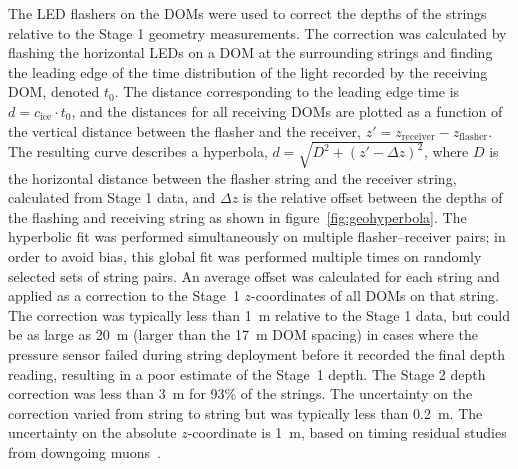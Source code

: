 The LED flashers on the DOMs were used to correct the depths of the strings relative to
the Stage 1 geometry measurements. The correction was calculated by flashing
the horizontal LEDs on a DOM at the surrounding strings and finding the
leading edge of the time distribution of the light recorded by the
receiving DOM, denoted $t_0$. The distance corresponding to the leading
edge time is $d = c_{\mathrm{ice}} \cdot t_0$, and the distances for all receiving
DOMs are plotted as a function of the vertical distance between the flasher
and the receiver, $z' = z_{\mathrm{receiver}} - z_{\mathrm{flasher}}$. The resulting curve
describes a hyperbola, $d = \sqrt{D^2 + (z' -\Delta z)^2}$, where $D$ is
the horizontal distance between the flasher string and the receiver string,
calculated from Stage 1 data, and $\Delta z$ is the relative offset between
the depths of the flashing and receiving string as shown in
figure~\ref{fig:geohyperbola}. The hyperbolic fit was performed
simultaneously on multiple flasher--receiver pairs; in order to avoid
bias, this global fit was performed multiple times on randomly
selected sets of string pairs. An average offset was calculated for
each string and applied as a correction to the Stage~1 $z$-coordinates
of all DOMs on that string. The correction was typically less than 1~m
relative to the Stage 1 data, but could be as large as 20~m (larger than the
17~m DOM spacing) in cases where the pressure sensor failed during string
deployment before it recorded the final depth reading, resulting in a
poor estimate of the Stage~1 depth. The Stage 2 depth correction was less than 3~m for 93\%
of the strings. The uncertainty on the correction varied from string
to string but was typically less than 0.2~m. The uncertainty on the
absolute $z$-coordinate is 1~m, based on timing residual studies from
downgoing muons~\cite{IC3:perf}.

